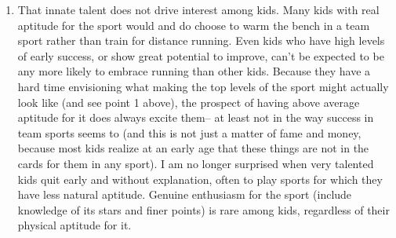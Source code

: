 \begin{enumerate}
    \item That innate talent does not drive interest among kids. Many kids with real aptitude for the sport would and do choose to warm the bench in a team sport rather than train for distance running. Even kids who have high levels of early success, or show great potential to improve, can't be expected to be any more likely to embrace running than other kids. Because they have a hard time envisioning what making the top levels of the sport might actually look like (and see point 1 above), the prospect of having above average aptitude for it does always excite them-- at least not in the way success in team sports seems to (and this is not just a matter of fame and money, because most kids realize at an early age that these things are not in the cards for them in any sport). I am no longer surprised when very talented kids quit early and without explanation, often to play sports for which they have less natural aptitude. Genuine enthusiasm for the sport (include knowledge of its stars and finer points) is rare among kids, regardless of their physical aptitude for it.


\end{enumerate}
